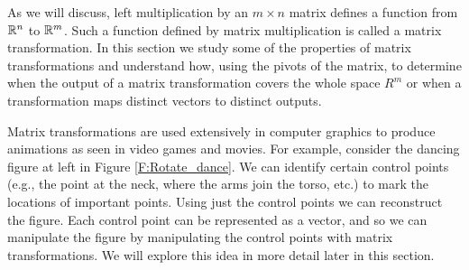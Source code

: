  \label{sec:matrix_transformations}

\vspace*{-17 pt}

\vspace*{13 pt}


As we will discuss, left multiplication by an $m \times n$ matrix defines a function from $\mathbb{R}^n$ to $\mathbb{R}^m$. Such a function defined by matrix multiplication is called a matrix transformation. In this section we study some of the properties of matrix transformations and understand how, using the pivots of the matrix, to determine when the output of a matrix transformation covers the whole space $R^m$ or when a transformation maps distinct vectors to distinct outputs. 

Matrix transformations are used extensively in computer graphics to produce animations as seen in video games and movies. For example, consider the dancing figure at left in Figure \ref{F:Rotate_dance}. We can identify certain control points (e.g., the point at the neck, where the arms join the torso, etc.) to mark the locations of important points. Using just the control points we can reconstruct the figure. Each control point can be represented as a vector, and so we can manipulate the figure by manipulating the control points with matrix transformations. We will explore this idea in more detail later in this section. 

